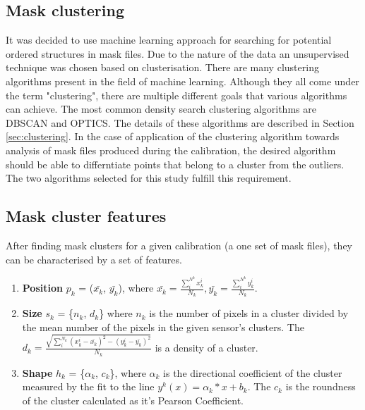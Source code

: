 \subsection{Mask clustering}

It was decided to use machine learning approach for searching for potential ordered structures in mask files. Due to the nature of the data an unsupervised technique was chosen based on clusterisation.
There are many clustering algorithms present in the field of machine learning. Although they all come under the term "clustering", there are multiple different goals that various algorithms can achieve. The most common density search clustering algorithms are DBSCAN and OPTICS. The details of these algorithms are described in Section \ref{sec:clustering}.
In the case of application of the clustering algorithm towards analysis of mask files produced during the calibration, the desired algorithm should be able to differntiate points that belong to a cluster from the outliers.
The two algorithms selected for this study fulfill this requirement.


\subsection{Mask cluster features}

After finding mask clusters for a given calibration (a one set of mask files), they can be characterised by a set of features.

\begin{enumerate}
\item \textbf{Position}  {$p_k$ = ($\bar{x_k}$, $\bar{y_k}$}), where $\bar{x_k} = \frac{\sum_{i}^{N^k}x_k^i}{N_k},
    \bar{y_k} = \frac{\sum_{i}^{N^k}y_k^i}{N_k}$.
\item \textbf{Size} $s_k$ = \{$n_k$, $d_k$\} where $n_k$ is the number of pixels in a cluster divided by the mean number of the pixels in the given sensor's clusters. The $d_k = \frac{\sqrt{\sum_{i}^{N_k}(x_k^i - \bar{x_k})^2 - (y_k^i - \bar{y_k})^2}}{N_k}$ is a density of a cluster.

\item \textbf{Shape} $h_k$ = \{$\alpha_k$, $c_k$\}, where $\alpha_k$ is the directional coefficient of the cluster measured by the fit to the line $y^k(x) = \alpha_k*x + b_k$. The $c_k$ is the roundness of the cluster calculated as it's Pearson Coefficient.

\end{enumerate}



